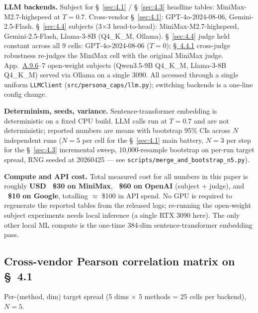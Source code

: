 \textbf{LLM backends.} Subject for \S~\ref{sec:4.1} / \S~\ref{sec:4.3} headline tables: MiniMax-M2.7-highspeed at $T = 0.7$. Cross-vendor \S~\ref{sec:4.1}: GPT-4o-2024-08-06, Gemini-2.5-Flash. \S~\ref{sec:4.4} subjects (3$\times$3 head-to-head): MiniMax-M2.7-highspeed, Gemini-2.5-Flash, Llama-3-8B (Q4\_K\_M, Ollama). \S~\ref{sec:4.4} judge held constant across all 9 cells: GPT-4o-2024-08-06 ($T=0$); \hyperref[sec:4.4.1]{\S~4.4.1} cross-judge robustness re-judges the MiniMax cell with the original MiniMax judge. App.~\hyperref[app:A.9.6]{A.9.6}--7 open-weight subjects (Qwen3.5-9B Q4\_K\_M, Llama-3-8B Q4\_K\_M) served via Ollama on a single 3090. All accessed through a single uniform \texttt{LLMClient} (\texttt{src/\allowbreak{}persona\_\allowbreak{}caps/\allowbreak{}llm.py}); switching backends is a one-line config change.

\textbf{Determinism, seeds, variance.} Sentence-transformer embedding is deterministic on a fixed CPU build. LLM calls run at $T = 0.7$ and are not deterministic; reported numbers are means with bootstrap 95\% CIs across $N$ independent runs ($N=5$ per cell for the \S~\ref{sec:4.1} main battery, $N=3$ per step for the \S~\ref{sec:4.3} incremental sweep, 10,000-resample bootstrap on per-run target spread, RNG seeded at 20260425 --- see \texttt{scripts/\allowbreak{}merge\_\allowbreak{}and\_\allowbreak{}bootstrap\_\allowbreak{}n5.py}).

\textbf{Compute and API cost.} Total measured cost for all numbers in this paper is roughly \textbf{USD ~\$30 on MiniMax}, \textbf{~\$60 on OpenAI} (subject + judge), and \textbf{~\$10 on Google}, totalling $\approx$ \$100 in API spend. No GPU is required to regenerate the reported tables from the released logs; re-running the open-weight subject experiments needs local inference (a single RTX 3090 here). The only other local ML compute is the one-time 384-dim sentence-transformer embedding pass.

\subsection{Cross-vendor Pearson correlation matrix on \S~4.1}
\label{app:A.7}

Per-(method, dim) target spread (5 dims $\times$ 5 methods = 25 cells per backend), $N=5$.

